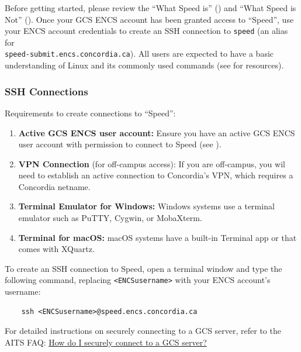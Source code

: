 
Before getting started, please review the 
``What Speed is'' ()
and ``What Speed is Not'' ().
Once your GCS ENCS account has been granted access to ``Speed'',
use your ENCS account credentials to create an SSH connection to \texttt{speed} (an alias for\\
\texttt{speed-submit.encs.concordia.ca}).
\noindent All users are expected to have a basic understanding of
Linux and its commonly used commands (see  for resources).

\subsubsection{SSH Connections}
\label{sect:ssh}

Requirements to create connections to ``Speed'':
\begin{enumerate}
	\item \textbf{Active GCS ENCS user account:} Ensure you have an active GCS ENCS user account with 
	permission to connect to Speed (see ).
	\item \textbf{VPN Connection} (for off-campus access): If you are off-campus, you wil need to establish an active connection to Concordia’s VPN, 
	which requires a Concordia netname.
	\item \textbf{Terminal Emulator for Windows:} Windows systems use a terminal emulator such as PuTTY, Cygwin, or MobaXterm.
	\item \textbf{Terminal for macOS:} macOS systems have a built-in Terminal app or  that comes with XQuartz.
\end{enumerate}

\noindent To create an SSH connection to Speed, open a terminal window and type the following command, replacing \verb!<ENCSusername>! with your ENCS account’s username:
\begin{verbatim}
    ssh <ENCSusername>@speed.encs.concordia.ca
\end{verbatim}

\noindent
For detailed instructions on securely connecting to a GCS server, refer to the AITS FAQ: 
\href{https://www.concordia.ca/ginacody/aits/support/faq/ssh-to-gcs.html}{How do I securely connect to a GCS server?}

